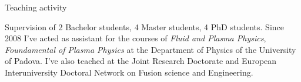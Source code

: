 \begin{cvblock}{Teaching activity}
\end{cvblock}
Supervision of 2 Bachelor students, 4 Master students, 4 PhD
students. Since 2008 I've acted as assistant for the courses of
\emph{Fluid and Plasma Physics}, \emph{Foundamental of Plasma Physics}
at the Department of Physics of the University of Padova. I've also
teached at the Joint Research Doctorate and European Interuniversity
Doctoral Network on Fusion science and Engineering.\\
